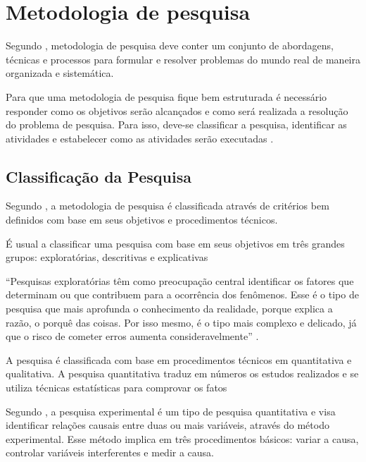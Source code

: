 \chapter{Metodologia de pesquisa}

Segundo , metodologia de pesquisa deve conter um conjunto de abordagens, técnicas e processos para formular e resolver problemas do mundo real de maneira organizada e sistemática.

Para que uma metodologia de pesquisa fique bem estruturada é necessário responder como os objetivos serão alcançados e  como será realizada a resolução do problema de pesquisa. Para isso, deve-se classificar a pesquisa, identificar as atividades e estabelecer como as atividades serão executadas \cite{forcon2014}.

\section{Classificação da Pesquisa}

Segundo , a metodologia de pesquisa é classificada através de critérios bem definidos com base em seus objetivos e procedimentos técnicos.

 É usual a classificar uma pesquisa com base em seus objetivos em três grandes grupos: exploratórias, descritivas e explicativas \cite[pág.~41]{gil2008}

\begin{citacao}
“Pesquisas exploratórias têm como preocupação central identificar os fatores que determinam ou que contribuem para a ocorrência dos fenômenos. Esse é o tipo de pesquisa que mais aprofunda o conhecimento da realidade, porque explica a razão, o porquê das coisas. Por isso mesmo, é o tipo mais complexo e delicado, já que o risco de cometer erros aumenta consideravelmente” \cite[pág.~43]{gil2008}.
\end{citacao}

A pesquisa é classificada com base em procedimentos técnicos em quantitativa e qualitativa. A pesquisa quantitativa traduz em números os estudos realizados e se utiliza técnicas estatísticas para comprovar os fatos \cite[pág.~9]{rodrigues2007}

Segundo \cite[pág.~2]{bandeira2012}, a pesquisa experimental é um tipo de pesquisa quantitativa e visa identificar relações causais entre duas ou mais variáveis, através do método experimental. Esse método implica em três procedimentos básicos: variar a causa, controlar variáveis interferentes e medir a causa.

